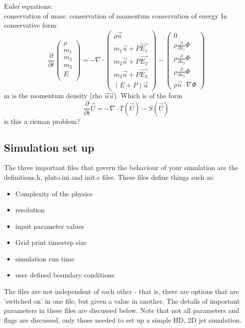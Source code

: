 \documentclass[12pt]{article}
\begin{document}
Euler equations:\\
conservation of mass:
conservation of momentum
conservation of energy
In conservative form:
\begin{equation}
\frac{\partial}{\partial t} \begin{pmatrix}
\rho \\
m_{1} \\
m_{2} \\
m_{3} \\
E \\
\end{pmatrix}
 = -\nabla\cdot
 \begin{pmatrix}
 \rho\vec{u}\\
 m_{1}\vec{u} + P\vec{E_1}\\
 m_{2}\vec{u} + P\vec{E_2}\\
 m_{3}\vec{u} + P\vec{E_3}\\
 (E + P)\vec{u}
 \end{pmatrix}
 -
 \begin{pmatrix}
 0\\
 \rho \frac{\partial}{\partial x_{1}}\Phi\\
 \rho \frac{\partial}{\partial x_{2}}\Phi\\
 \rho \frac{\partial}{\partial x_{3}}\Phi\\
 \rho \vec{u} \cdot \nabla\Phi
 \end{pmatrix}
\end{equation}
m is the momentum density (rho $\vec{u}\vec{u}$).
Which is of the form
\begin{equation}
\frac{\partial}{\partial t}\vec{U} = -\nabla \cdot T(\vec{U}) - S(\vec{U})
\end{equation}
is this a rieman problem?
\subsection{Simulation set up}

The three important files that govern the behaviour of your simulation are the definitions.h, pluto.ini and init.c files. These files define things such as:
\begin{itemize}
	\item Complexity of the physics
	\item resolution
	\item input parameter values
	\item Grid print timestep size
	\item simulation run time
	\item user defined boundary conditions
\end{itemize}
 The files are not independent of each other - that is, there are options that are 'switched on' in one file, but given a value in another. The details of important parameters in these files are discussed below. Note that not all parameters and flags are discussed, only those needed to set up a simple HD, 2D jet simulation.
\end{document}
